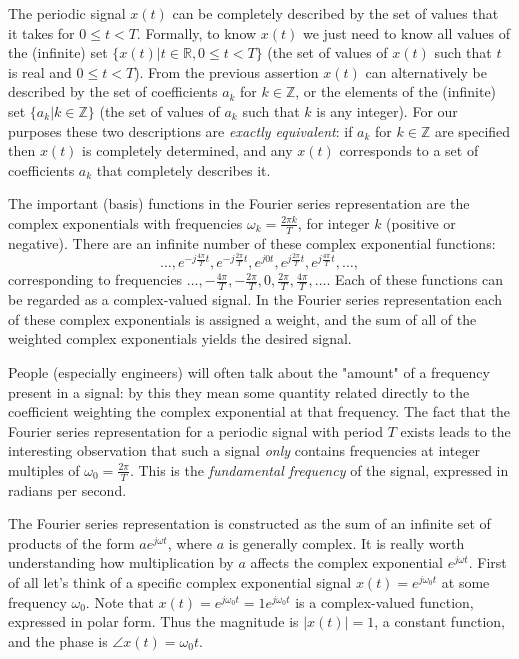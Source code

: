 \documentclass[10pt]{beamer}
\begin{document}
The periodic signal $x(t)$ can be completely described by the set of values that it takes for $0 \leq t < T$.  Formally, to know $x(t)$ we just need to know all values of the (infinite) set $\{x(t)|t \in \mathbb{R}, 0 \leq t < T\}$ (the set of values of $x(t)$ such that $t$ is real and $0 \leq t < T$).  From the previous assertion $x(t)$ can alternatively be described by the set of coefficients $a_k$ for $k \in \mathbb{Z}$, or the elements of the (infinite) set $\{a_k|k \in \mathbb{Z}\}$ (the set of values of $a_k$ such that $k$ is any integer).  For our purposes these two descriptions are {\em exactly equivalent}:  if $a_k$ for $k \in \mathbb{Z}$ are specified then $x(t)$ is completely determined, and any $x(t)$ corresponds to a set of coefficients $a_k$ that completely describes it.  

The important (basis) functions in the Fourier series representation are the complex exponentials with frequencies $\omega_k = \frac{2 \pi k}{T}$, for integer $k$ (positive or negative).  There are an infinite number of these complex exponential functions:
\begin{equation*}
  \ldots, e^{-j \frac{4 \pi}{T} t}, e^{-j \frac{2 \pi}{T} t}, e^{j 0 t}, e^{j \frac{2 \pi}{T} t}, e^{j \frac{4 \pi}{T} t}, \ldots,
\end{equation*}
corresponding to frequencies $\ldots, -\frac{4 \pi}{T}, -\frac{2 \pi}{T}, 0, \frac{2 \pi}{T}, \frac{4 \pi}{T}, \ldots$.  Each of these functions can be regarded as a complex-valued signal.  In the Fourier series representation each of these complex exponentials is assigned a weight, and the sum of all of the weighted complex exponentials yields the desired signal.

People (especially engineers) will often talk about the "amount" of a frequency present in a signal:  by this they mean some quantity related directly to the coefficient weighting the complex exponential at that frequency.  The fact that the Fourier series representation for a periodic signal with period $T$ exists leads to the interesting observation that such a signal {\em only} contains frequencies at integer multiples of $\omega_0 = \frac{2 \pi}{T}$.  This is the {\em fundamental frequency} of the signal, expressed in radians per second.

The Fourier series representation is constructed as the sum of an infinite set of products of the form $a e^{j \omega t}$, where $a$ is generally complex.  It is really worth understanding how multiplication by $a$ affects the complex exponential $e^{j \omega t}$.  First of all let's think of a specific complex exponential signal $x(t) = e^{j \omega_0 t}$ at some frequency $\omega_0$.  Note that $x(t) = e^{j \omega_0 t} = 1 e^{j \omega_0 t}$ is a complex-valued function, expressed in polar form.  Thus the magnitude is $|x(t)| = 1$, a constant function, and the phase is $\angle x(t) = \omega_0 t$.  
\end{document}
